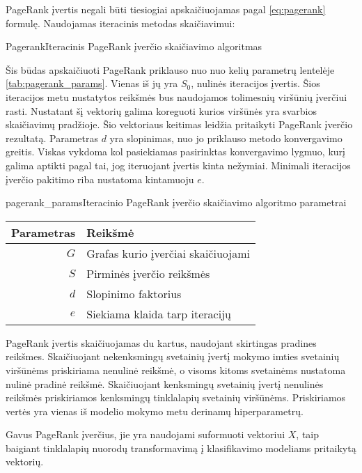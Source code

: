 PageRank įvertis negali būti tiesiogiai apskaičiuojamas pagal \ref{eq:pagerank} formulę. Naudojamas iteracinis metodas  skaičiavimui:

\begin{ktualgo}{Pagerank}{Iteracinis PageRank įverčio skaičiavimo algoritmas}
\Repeat
{}
\EndFor{}
\EndFor{}
\end{ktualgo}

Šis būdas apskaičiuoti PageRank priklauso nuo nuo kelių parametrų lentelėje \vref{tab:pagerank_params}. Vienas iš jų yra $S_0$, nulinės iteracijos įvertis. Šios iteracijos metu nustatytos reikšmės bus naudojamos tolimesnių viršūnių įverčiui rasti. Nustatant šį vektorių galima koreguoti kurios viršūnės yra svarbios skaičiavimų pradžioje. Šio vektoriaus keitimas leidžia pritaikyti PageRank įverčio rezultatą. Parametras $d$ yra slopinimas, nuo jo priklauso metodo konvergavimo greitis. Viskas vykdoma kol pasiekiamas pasirinktas konvergavimo lygmuo, kurį galima aptikti pagal tai, jog iteruojant įvertis kinta nežymiai. Minimali iteracijos įverčio pakitimo riba nustatoma kintamuoju $e$.

\begin{ktutable}{pagerank_params}{Iteracinio PageRank įverčio skaičiavimo algoritmo parametrai}
    \begin{tabular}{ | r | l | }
        \hline
        Parametras & Reikšmė \\ \hline
        $G$ & Grafas kurio įverčiai skaičiuojami \\ \hline
        $S$ & Pirminės įverčio reikšmės \\ \hline
        $d$ & Slopinimo faktorius \\ \hline
        $e$ & Siekiama klaida tarp iteracijų \\ \hline
    \end{tabular}
\end{ktutable}

PageRank įvertis skaičiuojamas du kartus, naudojant skirtingas pradines reikšmes. Skaičiuojant nekenksmingų svetainių įvertį mokymo imties svetainių viršūnėms priskiriama nenulinė reikšmė, o visoms kitoms svetainėms nustatoma nulinė pradinė reikšmė. Skaičiuojant kenksmingų svetainių įvertį nenulinės reikšmės priskiriamos kenksmingų tinklalapių svetainių viršūnėms. Priskiriamos vertės yra vienas iš modelio mokymo metu derinamų hiperparametrų.

Gavus PageRank įverčius, jie yra naudojami suformuoti vektoriui $X$, taip baigiant tinklalapių nuorodų transformavimą į klasifikavimo modeliams pritaikytą vektorių.

